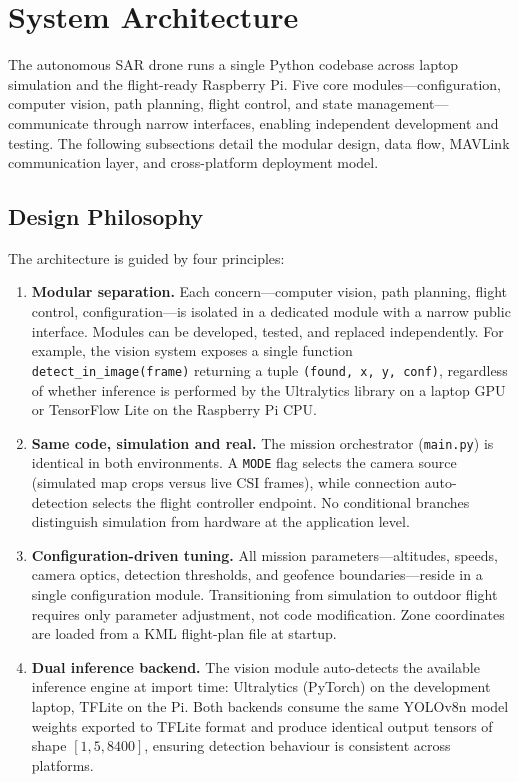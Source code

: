 \section{System Architecture}\label{sec:architecture}

The autonomous SAR drone runs a single Python codebase across laptop simulation and the flight-ready Raspberry Pi. Five core modules---configuration, computer vision, path planning, flight control, and state management---communicate through narrow interfaces, enabling independent development and testing. The following subsections detail the modular design, data flow, MAVLink communication layer, and cross-platform deployment model.

\subsection{Design Philosophy}\label{sec:arch-philosophy}

The architecture is guided by four principles:

\begin{enumerate}
    \item \textbf{Modular separation.} Each concern---computer vision, path planning, flight control, configuration---is isolated in a dedicated module with a narrow public interface. Modules can be developed, tested, and replaced independently. For example, the vision system exposes a single function \texttt{detect\_in\_image(frame)} returning a tuple \texttt{(found, x, y, conf)}, regardless of whether inference is performed by the Ultralytics library on a laptop GPU or TensorFlow Lite on the Raspberry Pi CPU.

    \item \textbf{Same code, simulation and real.} The mission orchestrator (\texttt{main.py}) is identical in both environments. A \texttt{MODE} flag selects the camera source (simulated map crops versus live CSI frames), while connection auto-detection selects the flight controller endpoint. No conditional branches distinguish simulation from hardware at the application level.

    \item \textbf{Configuration-driven tuning.} All mission parameters---altitudes, speeds, camera optics, detection thresholds, and geofence boundaries---reside in a single configuration module. Transitioning from simulation to outdoor flight requires only parameter adjustment, not code modification. Zone coordinates are loaded from a KML flight-plan file at startup.

    \item \textbf{Dual inference backend.} The vision module auto-detects the available inference engine at import time: Ultralytics (PyTorch) on the development laptop, TFLite on the Pi. Both backends consume the same YOLOv8n model weights exported to TFLite format and produce identical output tensors of shape $[1, 5, 8400]$, ensuring detection behaviour is consistent across platforms.
\end{enumerate}

